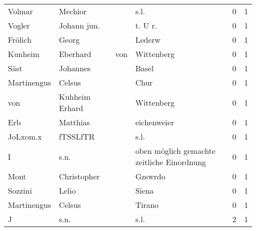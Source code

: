 \begin{tabular}{llllrr}
                   Volmar &                            Mechior &             &                                        s.l. &          0 &         1 \\
                   Vogler &                        Johann jun. &             &                                    t. U r.  &          0 &         1 \\
                  Frölich &                              Georg &             &                                      Lederw &          0 &         1 \\
                  Kunheim &                           Eberhard &         von &                                  Wittenberg &          0 &         1 \\
                     Säst &                           Johannes &             &                                       Basel &          0 &         1 \\
              Martinengus &                             Celsus &             &                                        Chur &          0 &         1 \\
                      von &                     Kuhheim Erhard &             &                                  Wittenberg &          0 &         1 \\
                      Erb &                           Matthias &             &                                 eichenweier &          0 &         1 \\
                 JoLxom.x &                           fTSSLfTR &             &                                        s.l. &          0 &         1 \\
                        I &                               s.n. &             &  oben möglich gemachte zeitliche Einordnung &          0 &         1 \\
                     Mont &                        Christopher &             &                                     Gzswrdo &          0 &         1 \\
                  Sozzini &                              Lelio &             &                                       Siena &          0 &         1 \\
              Martinengus &                             Celsus &             &                                      Tirano &          0 &         1 \\
                        J &                               s.n. &             &                                        s.l. &          2 &         1 \\

\end{tabular}
